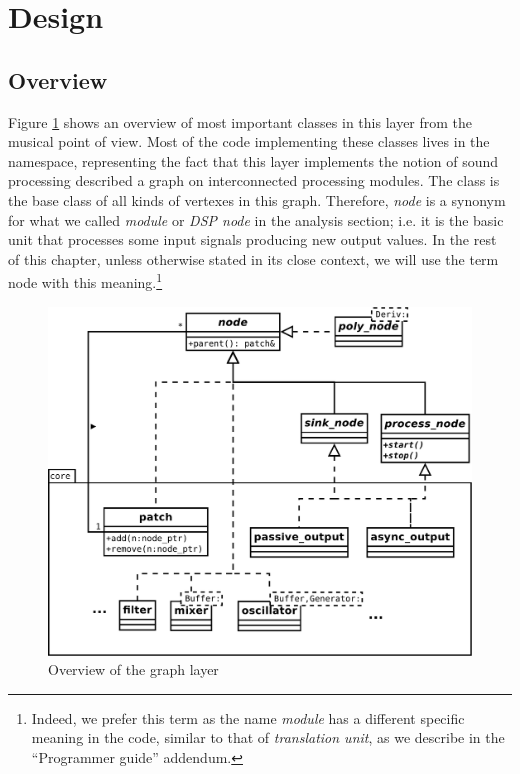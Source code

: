 \section{Design}

\subsection{Overview}

Figure \ref{fig:graphoverview} shows an overview of most important
classes in this layer from the musical point of view. Most of the code
implementing these classes lives in the 
namespace, representing the fact that this layer implements the notion
of sound processing described a graph on interconnected processing
modules. The  class is the base class of all kinds of
vertexes in this graph. Therefore, \emph{node} is a synonym for what
we called \emph{module} or \emph{DSP node} in the analysis section;
i.e. it is the basic unit that processes some input signals producing
new output values. In the rest of this chapter, unless otherwise
stated in its close context, we will use the term node with this
meaning.\footnote{Indeed, we prefer this term as the name
  \emph{module} has a different specific meaning in the code, similar
  to that of \emph{translation unit}, as we describe in the
  ``Programmer guide'' addendum.}

\begin{figure}[h]
  \centering
  \includegraphics[width=\textwidth]{pic/graph-node.pdf}
  \caption{Overview of the graph layer}
  \label{fig:graphoverview}
\end{figure}

